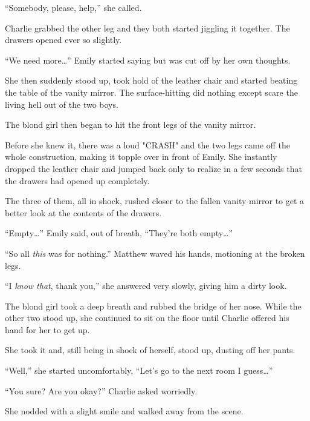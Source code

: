“Somebody, please, help,” she called.

Charlie grabbed the other leg and they both started jiggling it together. The drawers opened ever so slightly.

“We need more…” Emily started saying but was cut off by her own thoughts.

She then suddenly stood up, took hold of the leather chair and started beating the table of the vanity mirror. The surface-hitting did nothing except scare the living hell out of the two boys.

The blond girl then began to hit the front legs of the vanity mirror.

Before she knew it, there was a loud "CRASH" and the two legs came off the whole construction, making it topple over in front of Emily. She instantly dropped the leather chair and jumped back only to realize in a few seconds that the drawers had opened up completely.

The three of them, all in shock, rushed closer to the fallen vanity mirror to get a better look at the contents of the drawers.

“Empty…” Emily said, out of breath, “They're both empty…”

“So all \textit{this} was for nothing.” Matthew waved his hands, motioning at the broken legs.

“I \textit{know that}, thank you,” she answered very slowly, giving him a dirty look.

The blond girl took a deep breath and rubbed the bridge of her nose. While the other two stood up, she continued to sit on the floor until Charlie offered his hand for her to get up.

She took it and, still being in shock of herself, stood up, dusting off her pants.

“Well,” she started uncomfortably, “Let's go to the next room I guess…”

“You sure? Are you okay?” Charlie asked worriedly.

She nodded with a slight smile and walked away from the scene.